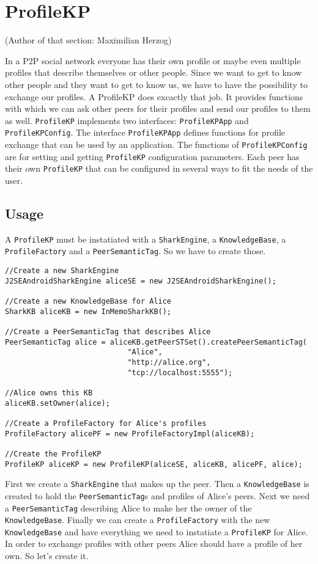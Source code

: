 \section{ProfileKP}
(Author of that section: Maximilian Herzog)
\label{sec:knowledgePorts:ProfileKP}

In a P2P social network everyone has their own profile or maybe even multiple profiles that describe themselves or other people. Since we want to get to know other people and they want to get to know us, we have to have the possibility to exchange our profiles. A ProfileKP does excactly that job. It provides functions with which we can ask other peers for their profiles and send our profiles to them as well. 
{\tt ProfileKP} implements two interfaces: {\tt ProfileKPApp} and {\tt ProfileKPConfig}. The interface {\tt ProfileKPApp} defines functions for profile exchange that can be used by an application. The functions of {\tt ProfileKPConfig} are for setting and getting {\tt ProfileKP} configuration parameters. Each peer has their own {\tt ProfileKP} that can be configured in several ways to fit the needs of the user.

\subsection{Usage}
A {\tt ProfileKP} must be instatiated with a {\tt SharkEngine}, a {\tt KnowledgeBase}, a {\tt ProfileFactory} and a {\tt PeerSemanticTag}. So we have to create those.

\begin{verbatim}
//Create a new SharkEngine
J2SEAndroidSharkEngine aliceSE = new J2SEAndroidSharkEngine();

//Create a new KnowledgeBase for Alice
SharkKB aliceKB = new InMemoSharkKB();

//Create a PeerSemanticTag that describes Alice
PeerSemanticTag alice = aliceKB.getPeerSTSet().createPeerSemanticTag(
							"Alice", 
							"http://alice.org", 
							"tcp://localhost:5555");

//Alice owns this KB
aliceKB.setOwner(alice);

//Create a ProfileFactory for Alice's profiles
ProfileFactory alicePF = new ProfileFactoryImpl(aliceKB);

//Create the ProfileKP
ProfileKP aliceKP = new ProfileKP(aliceSE, aliceKB, alicePF, alice);
\end{verbatim}

First we create a {\tt SharkEngine} that makes up the peer. Then a {\tt KnowledgeBase} is created to hold the {\tt PeerSemanticTag}s and profiles of Alice's peers. Next we need a {\tt PeerSemanticTag} describing Alice to make her the owner of the {\tt KnowledgeBase}. Finally we can create a {\tt ProfileFactory} with the new {\tt KnowledgeBase} and have everything we need to instatiate a {\tt ProfileKP} for Alice.
In order to exchange profiles with other peers Alice should have a profile of her own. So let's create it.


